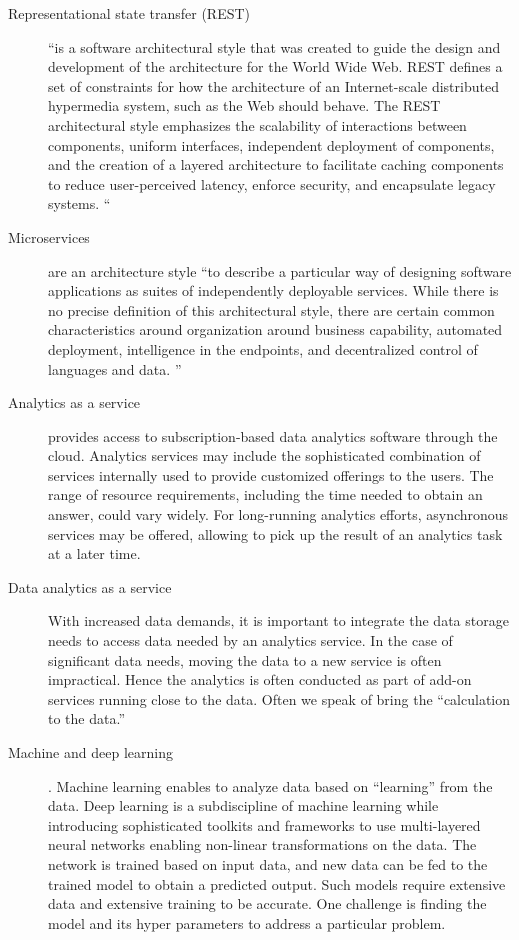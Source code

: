 \begin{description}
\item[Representational state transfer (REST)]
     ``is a software architectural style that was created to guide the
     design and development of the architecture for the World Wide
     Web. REST defines a set of constraints for how the architecture
     of an Internet-scale distributed hypermedia system, such as the
     Web should behave. The REST architectural style emphasizes the
     scalability of interactions between components, uniform
     interfaces, independent deployment of components, and the
     creation of a layered architecture to facilitate caching
     components to reduce user-perceived latency, enforce security,
     and encapsulate legacy systems.\cite{www-rest} ``

\item[Microservices]
     are an architecture style ``to describe a particular way of
     designing software applications as suites of independently
     deployable services. While there is no precise definition of this
     architectural style, there are certain common characteristics
     around organization around business capability, automated
     deployment, intelligence in the endpoints, and decentralized
     control of languages and data. \cite{www-microservices}''

\item[Analytics as a service]
     provides access to subscription-based data analytics software
     through the cloud. Analytics services may include the
     sophisticated combination of services internally used to provide
     customized offerings to the users. The range of resource
     requirements, including the time needed to obtain an answer, could
     vary widely. For long-running analytics efforts, asynchronous
     services may be offered, allowing to pick up the result of an
     analytics task at a later time.

\item[Data analytics as a service]
     With increased data demands, it is important to integrate the data
     storage needs to access data needed by an analytics service. In
     the case of significant data needs, moving the data
     to a new service is often impractical. Hence the analytics is often conducted as part
     of add-on services running close to the data. Often we speak of
     bring the ``calculation to the data.''

\item[Machine and deep learning].
     Machine learning enables to analyze data based on ``learning''
     from the data. Deep learning is a subdiscipline of machine
     learning while introducing sophisticated toolkits and frameworks
     to use multi-layered neural networks enabling non-linear
     transformations on the data. The network is trained based on
     input data, and new data can be fed to the trained model to
     obtain a predicted output. Such models require extensive data and
     extensive training to be accurate. One challenge is finding the model and its hyper parameters to address a particular
     problem.


\end{description}

